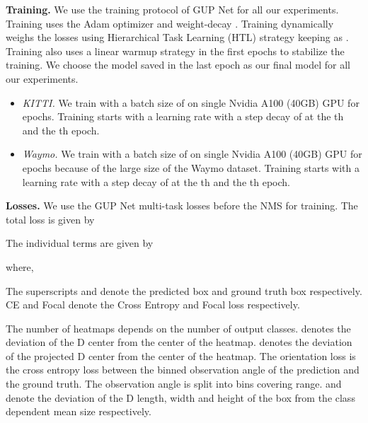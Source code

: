 \documentclass[runningheads]{llncs}
\newcommand{\twoD}{D}
\newcommand{\threeD}{D}
\newcommand{\kitti}{KITTI}
\newcommand{\waymo}{Waymo}
\newcommand{\gupNet}{GUP Net}
\newcommand{\noIndentHeading}[1]{\noindent\textbf{#1}}
\begin{document}
\noIndentHeading{Training.}
            We use the training protocol of \gupNet{} \cite{lu2021geometry} for all our experiments.
            Training uses the Adam optimizer \cite{kingma2014adam} and weight-decay  .
            Training dynamically weighs the losses using Hierarchical Task Learning (HTL)  \cite{lu2021geometry} strategy keeping  as  \cite{lu2021geometry}. 
            Training also uses a linear warmup strategy in the first  epochs to stabilize the training.
            We choose the model saved in the last epoch as our final model for all our experiments.
            \begin{itemize}
                \item \textit{\kitti .} 
                We train with a batch size of  on single Nvidia A100 (40GB) GPU for  epochs. 
                Training starts with a learning rate  with a step decay of  at the th and the th epoch.

                \item \textit{\waymo .}
                We train with a batch size of  on single Nvidia A100 (40GB) GPU for  epochs because of the large size of the \waymo{} dataset.
                Training starts with a learning rate  with a step decay of  at the th and the th epoch.
            \end{itemize}

\noIndentHeading{Losses.}
            We use the \gupNet{} \cite{lu2021geometry} multi-task losses before the NMS for training. The total loss  is given by
            
            The individual terms are given by
            
            where, 
            
            The superscripts  and  denote the predicted box and ground truth box respectively. 
            CE and Focal denote the Cross Entropy and Focal loss respectively.
            
            The number of heatmaps depends on the number of output classes.
             denotes the deviation of the \twoD{} center from the center of the heatmap.
             denotes the deviation of the projected \threeD{} center from the center of the heatmap.
            The orientation loss is the cross entropy loss between the binned observation angle of the prediction and the ground truth.
            The observation angle  is split into  bins covering  range.
             and  denote the deviation of the \threeD{} length, width and height of the box from the class dependent mean size respectively.
            
\end{document}
